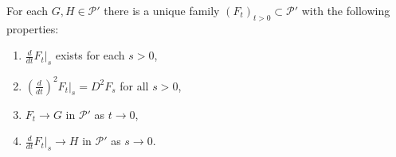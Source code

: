\begin{theorem}
For each $G, H \in \mathcal{P}'$ there is a unique family $(F_t)_{t > 0} \subset \mathcal{P}'$ with the following properties:
\begin{enumerate}
  \item $\displaystyle \frac{d}{dt} F_t\Big|_s$ exists for each $s > 0$,
  \item $\displaystyle \left(\frac{d}{dt}\right)^2 F_t\Big|_s = D^2 F_s$ for all $s > 0$,
  \item $F_t \to G$ in $\mathcal{P}'$ as $t \to 0$,
  \item $\displaystyle \frac{d}{dt} F_t\Big|_s \to H$ in $\mathcal{P}'$ as $s \to 0$.
\end{enumerate}
\end{theorem}
